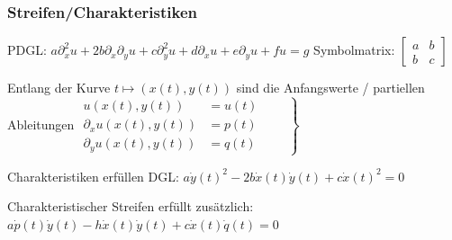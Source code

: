 \subsubsection{Streifen/Charakteristiken}
	PDGL: $a\partial_x^2u+2b\partial_x\partial_yu+c\partial_y^2u+d\partial_xu+e\partial_yu+fu=g$ Symbolmatrix: $ 
		\begin{bmatrix}
			a & b\\
			b & c
		\end{bmatrix}$
	
	Entlang der Kurve $t\mapsto(x(t),y(t))$ sind die Anfangswerte / partiellen Ableitungen
	$
	\left.
	\begin{aligned}
	u(x(t),y(t))&=u(t)\\
	\partial_xu(x(t),y(t))&=p(t)\\
	\partial_yu(x(t),y(t))&=q(t)
	\end{aligned}
	\qquad
	\right\}
	\label{charanfangs}
	$
	
	Charakteristiken erfüllen DGL: $a\dot y(t)^2-2b\dot x(t)\dot y(t)+c\dot x(t)^2=0$
	
	Charakteristischer Streifen erfüllt zusätzlich: $a\dot p(t)\dot y(t)-h\dot x(t)\dot y(t)+c\dot x(t)\dot q(t)=0$